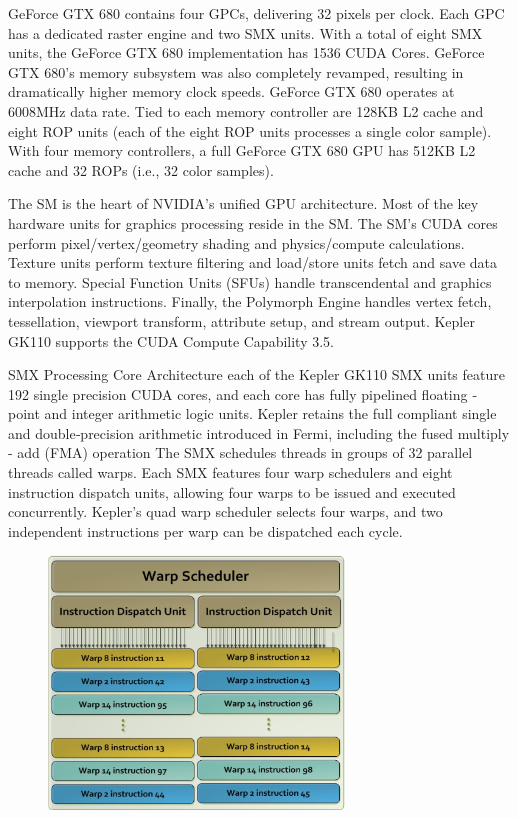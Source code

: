 GeForce GTX 680 contains four GPCs, delivering 32 pixels per clock. Each GPC has a dedicated raster engine and two SMX units. With a total of eight SMX units, the GeForce GTX 680 implementation has 1536 CUDA Cores.  GeForce GTX 680’s memory subsystem was also completely revamped, resulting in dramatically higher memory clock speeds. GeForce GTX 680 operates at 6008MHz data rate. Tied to each memory controller are 128KB L2 cache and eight ROP units (each of the eight ROP units processes a single color sample). With four memory controllers, a full GeForce GTX 680 GPU has 512KB L2 cache and 32 ROPs (i.e., 32 color samples).

The SM is the heart of NVIDIA’s unified GPU architecture. Most of the key hardware units for graphics processing reside in the SM. The SM’s CUDA cores perform pixel/vertex/geometry shading and physics/compute calculations. Texture units perform texture filtering and load/store units fetch and save data to memory. Special Function Units (SFUs) handle transcendental and graphics interpolation instructions. Finally, the Polymorph Engine handles vertex fetch, tessellation, viewport transform, attribute setup, and stream output. Kepler GK110 supports the CUDA Compute Capability 3.5.

SMX Processing Core Architecture each of the Kepler GK110 SMX units feature 192 single precision CUDA cores, and each core has fully pipelined floating ‐ point and integer arithmetic logic units. Kepler retains the full compliant single and double‐precision arithmetic introduced in Fermi, including the fused multiply - add (FMA) operation
The SMX schedules threads in groups of 32 parallel threads called warps. Each SMX features four warp schedulers and eight instruction dispatch units, allowing four warps to be issued and executed concurrently. Kepler’s quad warp scheduler selects four warps, and two independent instructions per warp can be dispatched each cycle.

 \begin{figure}[H]
    \centering
        \includegraphics[totalheight=0.5\textheight,width=0.7\textwidth]{warp_scheduler.png}
    \caption{}
    \label{fig:warp_scheduler}
\end{figure}


